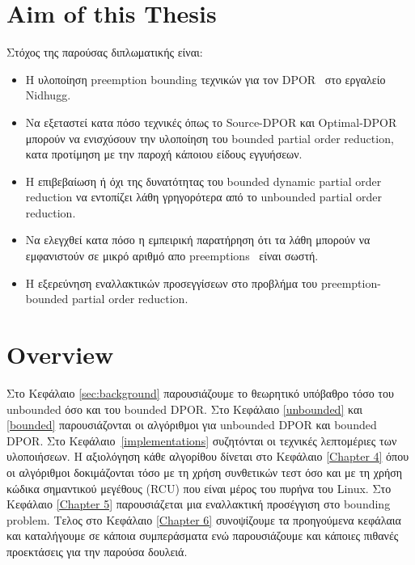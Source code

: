 \section{Aim of this Thesis}

Στόχος της παρούσας διπλωματικής είναι:
\begin{itemize}
\item Η υλοποίηση preemption bounding τεχνικών για τον DPOR~\cite{BPOR} στο εργαλείο Nidhugg.
\item Να εξεταστεί κατα πόσο τεχνικές όπως το Source-DPOR και Optimal-DPOR~\cite{AbdullaAronisJohnssonSagonasDPOR2014}
  μπορούν να ενισχύσουν την υλοποίηση του bounded partial order reduction, κατα προτίμηση με την παροχή κάποιου είδους εγγυήσεων.
\item Η επιβεβαίωση ή όχι της δυνατότητας του bounded dynamic partial order reduction να εντοπίζει λάθη γρηγορότερα από το unbounded partial order reduction.
\item Να ελεγχθεί κατα πόσο η εμπειρική παρατήρηση ότι τα λάθη μπορούν να εμφανιστούν σε μικρό αριθμό απο preemptions~\cite{Musu07} είναι σωστή.
\item Η εξερεύνηση εναλλακτικών προσεγγίσεων στο προβλήμα του preemption-bounded partial order reduction.
\end{itemize}

\iffalse
The purpose of this thesis is the implementation of a preemption bounding technique \cite{BPOR} for Nidhugg and the combination
of this technique with the a novel technique \cite{AbdullaAronisJohnssonSagonasDPOR2014} suggested for better coverage of the state space.
The bounded-DPOR was used to verify the linux kernel \cite{LinuxKernel} and specifically RCU \cite{Spin}. RCU is a synchronization
mechanism used heavily in Linux kernel, and many of the kernel’s subsystems rely on RCU’s correct operation. By using BPOR the minimum preemptive
switches required to track failure injections were counted. As a result the empirical observation that errors occur in a small bound count was confirmed.
Moreover, the possible application of various optimizations used for unbounded DPOR on bounded DPOR are examined. 
\fi

\section{Overview}
Στο Κεφάλαιο \ref{sec:background} παρουσιάζουμε το θεωρητικό υπόβαθρο τόσο του unbounded όσο και του bounded DPOR.
Στο Κεφάλαιο \ref{unbounded} και \ref{bounded} παρουσιάζονται οι αλγόριθμοι για unbounded DPOR και bounded DPOR.
Στο Κεφάλαιο~\ref{implementations} συζητόνται οι τεχνικές λεπτομέριες των υλοποιήσεων.
Η αξιολόγηση κάθε αλγορίθου δίνεται στο Κεφάλαιο \ref{Chapter 4} όπου οι
αλγόριθμοι δοκιμάζονται τόσο με τη χρήση συνθετικών τεστ όσο και με τη χρήση
κώδικα σημαντικού μεγέθους (RCU) που είναι μέρος του πυρήνα του Linux.
Στο Κεφάλαιο \ref{Chapter 5} παρουσιάζεται μια εναλλακτική προσέγγιση στο bounding problem.
Τελος στο Κεφάλαιο \ref{Chapter 6} συνοψίζουμε τα προηγούμενα κεφάλαια και καταλήγουμε σε κάποια συμπεράσματα ενώ παρουσιάζουμε και κάποιες πιθανές προεκτάσεις για την παρούσα δουλειά.
